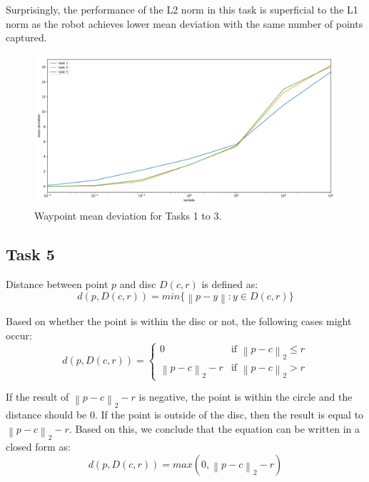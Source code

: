 Surprisingly, the performance of the L2 norm in this task is superficial to the L1 norm as the robot achieves lower mean deviation with the same number of points captured. 

\begin{figure}[!htb]
    \centering
    \includegraphics[width=\linewidth]{part1/notebooks/task_1_2_3_waypoint_mean_dev.pdf}
    \caption{Waypoint mean deviation for Tasks 1 to 3.}
    \label{fig:task4:waypoint:dev}
\end{figure}

\subsection{Task 5}

Distance between point $p$ and disc $D\left(c, r\right)$ is defined as:
\begin{equation}
    d\left(p,D\left(c,r\right)\right) = \textit{min}\{\left\|p-y\right\|: y \in D\left(c, r\right)\}
\end{equation}

Based on whether the point is within the disc or not, the following cases might occur:
\begin{equation}
	d\left( p,D(c,r) \right) = 
	\begin{cases} 
		0                           & \text{if } \left\|p - c\right\|_2 \leq r\\ 
		\left\|p - c\right\|_2 - r 	& \text{if } \left\|p - c\right\|_2 > r
	\end{cases}
\end{equation}

If the result of $\left\|p - c\right\|_2 - r$ is negative, the point is within the circle and the distance should be 0. If the point is outside of the disc, then the result is equal to $\left\|p - c\right\|_2 - r$. Based on this, we conclude that the equation can be written in a closed form as:
\begin{equation}
	d\left(p,D\left(c,r\right)\right) = \textit{max}\left(0, \left\|p - c\right\|_2 - r \right)
\end{equation}

